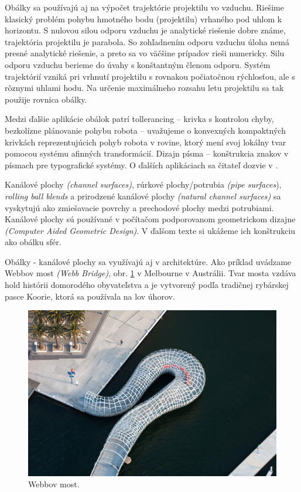 Obálky sa používajú aj na výpočet trajektórie projektilu vo vzduchu. Riešime klasický problém pohybu hmotného bodu (projektilu) vrhaného pod uhlom k horizontu. S nulovou silou odporu vzduchu je analytické riešenie dobre známe, trajektória projektilu je parabola. So zohľadnením odporu vzduchu úloha nemá presné analytické riešenie, a preto sa vo väčšine prípadov rieši numericky. Silu odporu vzduchu berieme do úvahy s konštantným členom odporu. Systém trajektórií vzniká pri vrhnutí projektilu s rovnakou počiatočnou rýchlosťou, ale s rôznymi uhlami hodu. Na určenie maximálneho rozsahu letu projektilu sa tak použije rovnica obálky. \cite{Chud09}

Medzi ďalšie aplikácie obálok patrí tollerancing – krivka s kontrolou chyby, bezkolízne plánovanie pohybu robota – uvažujeme o konvexných kompaktných krivkách reprezentujúcich pohyb robota v rovine, ktorý mení svoj lokálny tvar pomocou systému afinných transformácií. Dizajn písma – konštrukcia znakov v písmach pre typografické systémy. O ďalších aplikáciach sa čitateľ dozvie v \cite{Pott09}.

Kanálové plochy \textit{(channel surfaces)}, rúrkové plochy/potrubia \textit{(pipe surfaces}), \textit{rolling ball blends} a prirodzené kanálové plochy \textit{(natural channel surfaces)} sa vyskytujú ako zmiešavacie povrchy a prechodové plochy medzi potrubiami. Kanálové plochy sú používané v počítačom podporovanom geometrickom dizajne \textit{(Computer Aided Geometric Design)}. V ďalšom texte si ukážeme ich konštrukciu ako obálku sfér.

Obálky - kanálové plochy sa využívajú aj v architektúre. Ako príklad uvádzame Webbov most \textit{(Webb Bridge)}, obr. \ref{fig:webb_bridge} v Melbourne v Austrálii. Tvar mosta vzdáva hold histórii domorodého obyvateľstva a je vytvorený podľa tradičnej rybárskej pasce Koorie, ktorá sa používala na lov úhorov.

\begin{figure}[h!]
	\centering
	\includegraphics[width=\textwidth]{images/webbbridge.jpg}
	\caption[Webbov most.]{Webbov most. \cite{WebbBridge}}
	\label{fig:webb_bridge}
\end{figure}

